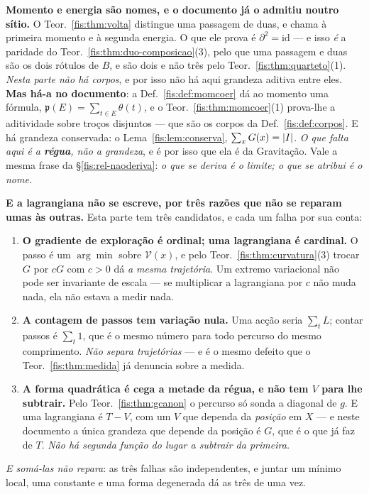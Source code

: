 \documentclass[livro.tex]{subfiles}
\begin{document}
\medskip\noindent\textbf{Momento e energia são nomes, e o documento já o admitiu
noutro sítio.} O Teor.~\ref{fis:thm:volta} distingue uma passagem de duas, e
chama à primeira momento e à segunda energia. O que ele prova é
$\partial^{2}=\mathrm{id}$ --- e isso \emph{é} a paridade do
Teor.~\ref{fis:thm:duo-composicao}(3), pelo que uma passagem e duas são os dois
rótulos de $B$, e são dois e não três pelo Teor.~\ref{fis:thm:quarteto}(1).
\emph{Nesta parte não há corpos}, e por isso não há aqui grandeza aditiva entre
eles. \textbf{Mas há-a no documento}: a Def.~\ref{fis:def:momcoer} dá ao momento
uma fórmula, $\mathfrak{p}(E)=\sum_{t\in E}\theta(t)$, e o
Teor.~\ref{fis:thm:momcoer}(1) prova-lhe a aditividade sobre troços disjuntos ---
que são os corpos da Def.~\ref{fis:def:corpos}. E há grandeza conservada: o
Lema~\ref{fis:lem:conserva}, $\sum_x G(x)=\lvert I\rvert$. \emph{O que falta aqui é a
\textbf{régua}, não a grandeza}, e é por isso que ela é da Gravitação. Vale a
mesma frase da §\ref{fis:rel-naoderiva}: \emph{o que se deriva é o limite; o que
se atribui é o nome.}

\medskip\noindent\textbf{E a lagrangiana não se escreve, por três razões que não
se reparam umas às outras.} Esta parte tem três candidatos, e cada um falha por
sua conta:
\begin{enumerate}\itemsep3pt
\item[(i)] \textbf{O gradiente de exploração é ordinal; uma lagrangiana é
cardinal.} O passo é um $\arg\min$ sobre $\mathcal{V}(x)$, e pelo
Teor.~\ref{fis:thm:curvatura}(3) trocar $G$ por $cG$ com $c>0$ dá \emph{a mesma
trajetória}. Um extremo variacional não pode ser invariante de escala --- se
multiplicar a lagrangiana por $c$ não muda nada, ela não estava a medir nada.
\item[(ii)] \textbf{A contagem de passos tem variação nula.} Uma acção seria
$\sum_t L$; contar passos é $\sum_t 1$, que é o mesmo número para todo percurso
do mesmo comprimento. \emph{Não separa trajetórias} --- e é o mesmo defeito que o
Teor.~\ref{fis:thm:medida} já denuncia sobre a medida.
\item[(iii)] \textbf{A forma quadrática é cega a metade da régua, e não tem $V$
para lhe subtrair.} Pelo Teor.~\ref{fis:thm:gcanon} o percurso só sonda a
diagonal de $g$. E uma lagrangiana é $T-V$, com um $V$ que dependa da
\emph{posição} em $X$ --- e neste documento a única grandeza que depende da
posição é $G$, que é o que já faz de $T$. \emph{Não há segunda função do lugar a
subtrair da primeira.}
\end{enumerate}
\emph{E somá-las não repara}: as três falhas são independentes, e juntar um
mínimo local, uma constante e uma forma degenerada dá as três de uma vez.
\end{document}

